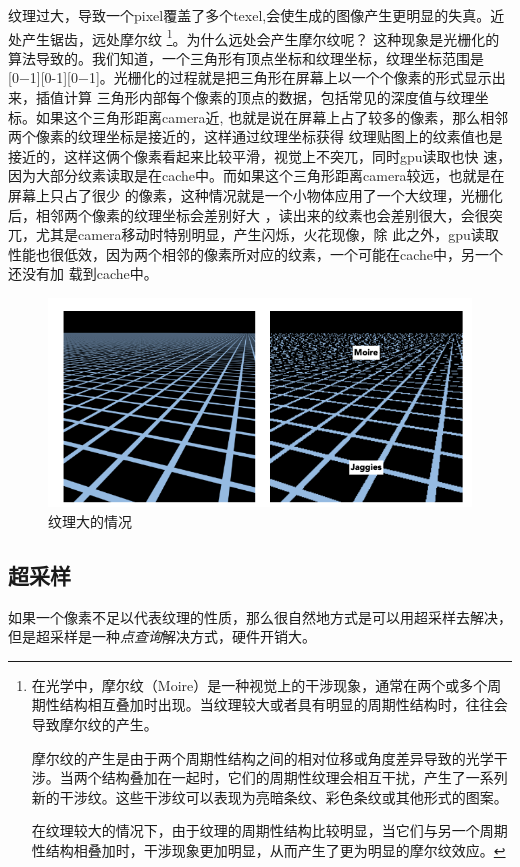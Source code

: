 纹理过大，导致一个pixel覆盖了多个texel,会使生成的图像产生更明显的失真。近处产生锯齿，远处摩尔纹
\footnote{在光学中，摩尔纹（Moire）是一种视觉上的干涉现象，通常在两个或多个周期性结构相互叠加时出现。当纹理较大或者具有明显的周期性结构时，往往会导致摩尔纹的产生。

摩尔纹的产生是由于两个周期性结构之间的相对位移或角度差异导致的光学干涉。当两个结构叠加在一起时，它们的周期性纹理会相互干扰，产生了一系列新的干涉纹。这些干涉纹可以表现为亮暗条纹、彩色条纹或其他形式的图案。

在纹理较大的情况下，由于纹理的周期性结构比较明显，当它们与另一个周期性结构相叠加时，干涉现象更加明显，从而产生了更为明显的摩尔纹效应。}。为什么远处会产生摩尔纹呢？
这种现象是光栅化的算法导致的。我们知道，一个三角形有顶点坐标和纹理坐标，纹理坐标范围是
[0−1][0-1][0−1]。光栅化的过程就是把三角形在屏幕上以一个个像素的形式显示出来，插值计算
三角形内部每个像素的顶点的数据，包括常见的深度值与纹理坐标。如果这个三角形距离camera近,
也就是说在屏幕上占了较多的像素，那么相邻两个像素的纹理坐标是接近的，这样通过纹理坐标获得
纹理贴图上的纹素值也是接近的，这样这俩个像素看起来比较平滑，视觉上不突兀，同时gpu读取也快
速，因为大部分纹素读取是在cache中。而如果这个三角形距离camera较远，也就是在屏幕上只占了很少
的像素，这种情况就是一个小物体应用了一个大纹理，光栅化后，相邻两个像素的纹理坐标会差别好大
，读出来的纹素也会差别很大，会很突兀，尤其是camera移动时特别明显，产生闪烁，火花现像，除
此之外，gpu读取性能也很低效，因为两个相邻的像素所对应的纹素，一个可能在cache中，另一个还没有加
载到cache中。

\begin{figure}[H]
    \centering
    \includegraphics[scale=0.4]{figures/纹理大的情况.png}
    \caption{纹理大的情况}
\end{figure}

\subsection*{超采样}
如果一个像素不足以代表纹理的性质，那么很自然地方式是可以用超采样去解决，但是超采样是一种\textsl{点查询}解决方式，硬件开销大。

